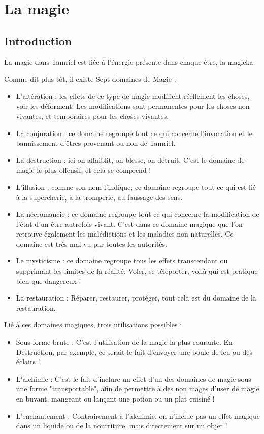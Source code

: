 \chapter{La magie}

\section{Introduction}

La magie dans Tamriel est liée à l'énergie présente dans chaque être, la magicka.

Comme dit plus tôt, il existe Sept domaines de Magie :

\begin{itemize}
\item
L'altération : les effets de ce type de magie modifient réellement les choses, voir les déforment. Les modifications sont permanentes pour les choses non vivantes, et temporaires pour les choses vivantes.
\item
La conjuration : ce domaine regroupe tout ce qui concerne l'invocation et le bannissement d'êtres provenant ou non de Tamriel.
\item
La destruction : ici on affaiblit, on blesse, on détruit. C'est le domaine de magie le plus offensif, et cela se comprend !
\item
L'illusion : comme son nom l'indique, ce domaine regroupe tout ce qui est lié à la supercherie, à la tromperie, au faussage des sens.
\item
La nécromancie : ce domaine regroupe tout ce qui concerne la modification de l'état d'un être autrefois vivant. C'est dans ce domaine magique que l'on retrouve également les malédictions et les maladies non naturelles. Ce domaine est très mal vu par toutes les autorités.
\item
Le mysticisme : ce domaine regroupe tous les effets transcendant ou supprimant les limites de la réalité. Voler, se téléporter, voilà qui est pratique bien que dangereux !
\item
La restauration : Réparer, restaurer, protéger, tout cela est du domaine de la restauration.
\end{itemize}

Lié à ces domaines magiques, trois utilisations possibles :

\begin{itemize}
\item
Sous forme brute : C'est l'utilisation de la magie la plus courante. En Destruction, par exemple, ce serait le fait d'envoyer une boule de feu ou des éclairs !
\item
L'alchimie : C'est le fait d'inclure un effet d'un des domaines de magie sous une forme "transportable", afin de permettre à des non mages d'user de magie en buvant, mangeant ou lançant une potion ou un plat cuisiné !
\item
L'enchantement : Contrairement à l'alchimie, on n'inclue pas un effet magique dans un liquide ou de la nourriture, mais directement sur un objet !
\end{itemize}

